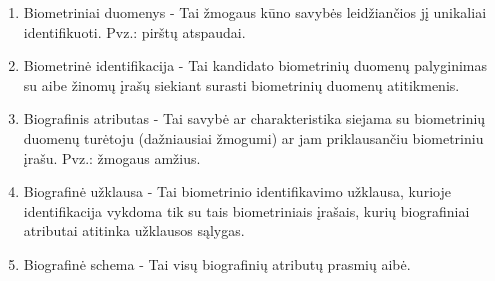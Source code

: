 \begin{enumerate}
\item Biometriniai duomenys - Tai žmogaus kūno savybės leidžiančios jį unikaliai identifikuoti. Pvz.: pirštų atspaudai.
\item Biometrinė identifikacija - Tai kandidato biometrinių duomenų palyginimas su aibe žinomų įrašų siekiant surasti biometrinių duomenų atitikmenis.
\item Biografinis atributas - Tai savybė ar charakteristika siejama su biometrinių duomenų turėtoju (dažniausiai žmogumi) ar jam priklausančiu biometriniu įrašu. Pvz.: žmogaus amžius.
\item Biografinė užklausa - Tai biometrinio identifikavimo užklausa, kurioje identifikacija vykdoma tik su tais biometriniais įrašais, kurių biografiniai atributai atitinka užklausos sąlygas.
\item Biografinė schema - Tai visų biografinių atributų prasmių aibė.
\end{enumerate}


